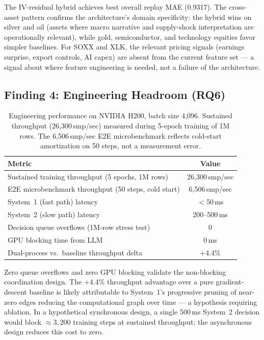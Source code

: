 \documentclass[11pt,a4paper]{article}
\begin{document}
The IV-residual hybrid achieves best overall replay MAE (0.9317). The cross-asset
pattern confirms the architecture's domain specificity: the hybrid wins on silver and
oil (assets where macro narrative and supply-shock interpretation are operationally
relevant), while gold, semiconductor, and technology equities favor simpler baselines.
For SOXX and XLK, the relevant pricing signals (earnings surprise, export controls,
AI capex) are absent from the current feature set --- a signal about where feature
engineering is needed, not a failure of the architecture.

\subsection{Finding 4: Engineering Headroom (RQ6)}
\label{sec:experiments:headroom}

\begin{table}[ht]
\centering
\caption{Engineering performance on NVIDIA H200, batch size 4,096. Sustained
throughput (26,300\,smp/sec) measured during 5-epoch training of 1M rows. The
6,506\,smp/sec E2E microbenchmark reflects cold-start amortization on 50 steps, not
a measurement error.}
\begin{tabular}{@{}lc@{}}
\toprule
Metric & Value \\ \midrule
Sustained training throughput (5 epochs, 1M rows) & 26,300\,smp/sec \\
E2E microbenchmark throughput (50 steps, cold start) & 6,506\,smp/sec \\
System~1 (fast path) latency & $<$50\,ms \\
System~2 (slow path) latency & 200--500\,ms \\
Decision queue overflows (1M-row stress test) & 0 \\
GPU blocking time from LLM & 0\,ms \\
Dual-process vs.\ baseline throughput delta & +4.4\% \\
\bottomrule
\end{tabular}
\label{tab:engineering}
\end{table}

Zero queue overflows and zero GPU blocking validate the non-blocking coordination
design. The +4.4\% throughput advantage over a pure gradient-descent baseline is
likely attributable to System~1's progressive pruning of near-zero edges reducing
the computational graph over time --- a hypothesis requiring ablation. In a
hypothetical synchronous design, a single 500\,ms System~2 decision would block
$\approx 3{,}200$ training steps at sustained throughput; the asynchronous design
reduces this cost to zero.
\end{document}
